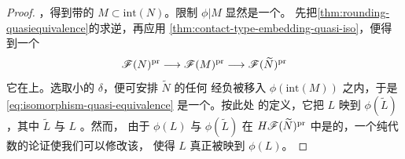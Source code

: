 \begin{proof}
\trRoundOffCorners，得到带\trContactTypeBoundary{}的\trExactSymplectic\trManifold{}
$M\subset\mathrm{int}(N)$。限制 $\phi|M$ 显然是一个\trExactSymplectic\trEmbedding。
先把\cref{thm:rounding-quasiequivalence}的\trQuasiequivalence{}求逆，再应用
\cref{thm:contact-type-embedding-quasi-iso}，便得到一个\trAFunctor
\begin{equation}\label{eq:isomorphism-quasi-equivalence}
\mathscr{F}(N)^{\mathrm{pr}}\longrightarrow\mathscr{F}(M)^{\mathrm{pr}}
\longrightarrow\mathscr{F}(\widetilde{N})^{\mathrm{pr}}
\end{equation}
它在\trCohomology{}上\trFullyFaithful。选取小的 $\delta$，便可安排 $\widetilde{N}$ 的任何%
\trExact\trLagrange\trSubmanifold{}经负\trLiouville\trFlow{}被移入 $\phi(\mathrm{int}(M))$
之内，于是\eqref{eq:isomorphism-quasi-equivalence} 是一个\trQuasiequivalence。按此处
的定义，它把 $L$ 映到 $\phi(\tilde{L})$，其中 $\tilde{L}$ 与 $L$ \trIsotopy。然而，
由于 $\phi(L)$ 与 $\phi(\tilde{L})$ 在 $H\mathscr{F}(\widetilde{N})^{\mathrm{pr}}$
中是\trIsomorphic{}的\trObject，一个纯代数的论证使我们可以修改该\trFunctor，%
使得 $L$ 真正被映到 $\phi(L)$。
\end{proof}
